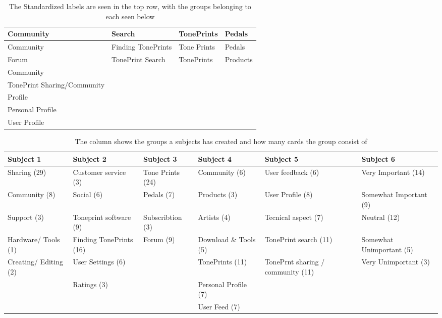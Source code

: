 \begin{table}
\begin{tabular}{|l|l|l|l|}
\hline
Community & Search & TonePrints & Pedals \\ \hline
Community & Finding TonePrints & Tone Prints & Pedals \\
Forum & TonePrint Search & TonePrints & Products \\
Community & & & \\
TonePrint Sharing/Community & & & \\ \hline
Profile & & & \\ \hline
Personal Profile & & & \\
User Profile & & & \\ \hline
\end{tabular}
\caption{The Standardized labels are seen in the top row, with the groups belonging to each seen below }
\label{StandardizedLabels}
\end{table}

\begin{table}[h]
\small
\begin{tabularx}{\textwidth}{|R|R|R|R|R|R|}
\hline
\textbf{Subject 1} & \textbf{Subject 2} & \textbf{Subject 3} & \textbf{Subject 4} & \textbf{Subject 5} & \textbf{Subject 6} \\ \hline
Sharing (29) & Customer service (3) & Tone Prints (24) & Community (6) & User feedback (6) & Very Important (14) \\ \hline
Community (8) & Social (6) & Pedals (7) & Products (3) & User Profile (8) & Somewhat Important (9) \\ \hline
Support (3) & Toneprint software (9) & Subscribtion (3) & Artists (4) & Tecnical aspect (7) & Neutral (12) \\ \hline
Hardware/ Tools (1) & Finding TonePrints (16) & Forum (9) & Download \& Tools (5) & TonePrint search (11) & Somewhat Unimportant (5) \\ \hline
Creating/ Editing (2) & User Settings (6) && TonePrints (11) & TonePrnt sharing / community (11) & Very Unimportant (3) \\ \hline
& Ratings (3) && Personal Profile (7) && \\ \hline
&&& User Feed (7) && \\ \hline
\end{tabularx}
\caption{The column shows the groups a subjects has created and how many cards the group consist of}
\label{Tab:GroupOverview}
\end{table}

